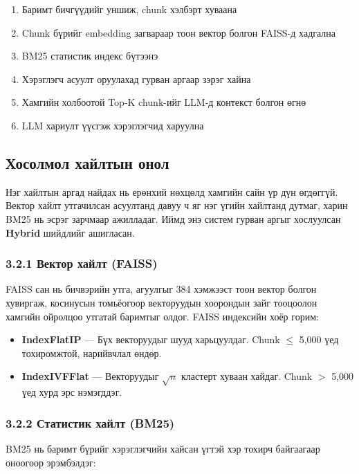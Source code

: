 \documentclass[11pt,a4paper]{article}
\begin{document}
\begin{enumerate}
    \item Баримт бичгүүдийг уншиж, chunk хэлбэрт хуваана
    \item Chunk бүрийг embedding загвараар тоон вектор болгон FAISS-д хадгална
    \item BM25 статистик индекс бүтээнэ
    \item Хэрэглэгч асуулт оруулахад гурван аргаар зэрэг хайна
    \item Хамгийн холбоотой Top-K chunk-ийг LLM-д контекст болгон өгнө
    \item LLM хариулт үүсгэж хэрэглэгчид харуулна
\end{enumerate}

\subsection{Хосолмол хайлтын онол}

Нэг хайлтын аргад найдах нь ерөнхий нөхцөлд хамгийн сайн үр дүн өгдөггүй. Вектор хайлт утгачилсан асуултанд давуу ч яг нэг үгийн хайлтанд дутмаг, харин BM25 нь эсрэг зарчмаар ажилладаг. Иймд энэ систем гурван аргыг хослуулсан \textbf{Hybrid} шийдлийг ашигласан.

\subsubsection*{3.2.1 Вектор хайлт (FAISS)}

FAISS сан нь бичвэрийн утга, агуулгыг 384 хэмжээст тоон вектор болгон хувиргаж, косинусын томьёогоор векторуудын хоорондын зайг тооцоолон хамгийн ойролцоо утгатай баримтыг олдог. FAISS индексийн хоёр горим:

\begin{itemize}
    \item \textbf{IndexFlatIP} — Бүх векторуудыг шууд харьцуулдаг. Chunk $\le$ 5,000 үед тохиромжтой, нарийвчлал өндөр.
    \item \textbf{IndexIVFFlat} — Векторуудыг $\sqrt{n}$ кластерт хуваан хайдаг. Chunk $>$ 5,000 үед хурд эрс нэмэгддэг.
\end{itemize}

\subsubsection*{3.2.2 Статистик хайлт (BM25)}

BM25 нь баримт бүрийг хэрэглэгчийн хайсан үгтэй хэр тохирч байгаагаар оноогоор эрэмбэлдэг:
\end{document}
